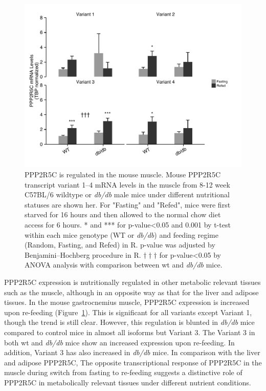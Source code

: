 \begin{figure}[!tb]
\centering
\includegraphics[width=1\textwidth]{figs/fig2-3 muscle ppp2r5c.pdf}
\caption[PPP2R5C expression in the muscle]{\footnotesize PPP2R5C is regulated in the mouse muscle. Mouse PPP2R5C transcript variant 1--4 mRNA levels in the muscle from 8-12 week C57BL/6 wildtype or \textit{db/db} male mice under different nutritional statuses are shown her. For "Fasting" and "Refed", mice were first starved for 16 hours and then allowed to the normal chow diet access for 6 hours. * and *** for p-value<0.05 and 0.001 by t-test within each mice genotype (WT or \textit{db/db}) and feeding regime (Random, Fasting, and Refed) in R. p-value was adjusted by Benjamini–Hochberg procedure in R. $\dagger\dagger\dagger$ for p-value<0.05 by \gls{ANOVA} analysis with comparison between wt and \textit{db/db} mice.}
\label{fig:fig2.3}
\end{figure}

PPP2R5C expression is nutritionally regulated in other metabolic relevant tissues such as the muscle, although in an opposite way as that for the liver and adipose tissues. In the mouse gastrocnemius muscle, PPP2R5C expression is increased upon re-feeding (Figure~\ref{fig:fig2.3}). This is significant for all variants except Variant 1, though the trend is still clear. However, this regulation is blunted in \textit{db/db}  mice compared to control mice in almost all isoforms but Variant 3. The Variant 3 in both wt and \textit{db/db} mice show an increased expression upon re-feeding. In addition, Variant 3 has also increased in \textit{db/db} mice. In comparison with the liver and adipose PPP2R5C, The opposite transcriptional response of PPP2R5C in the muscle during switch from fasting to re-feeding suggests a distinctive role of PPP2R5C in metabolically relevant tissues under different nutrient conditions.


